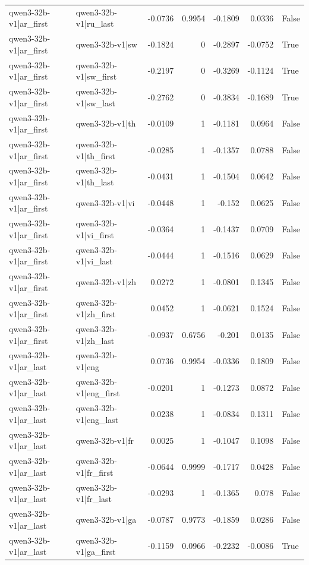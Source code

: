 \begin{table}
\begin{tabular}{l l r r r r l}
qwen3-32b-v1|ar_first & qwen3-32b-v1|ru_last & -0.0736 & 0.9954 & -0.1809 & 0.0336 & False \\
qwen3-32b-v1|ar_first & qwen3-32b-v1|sw & -0.1824 & 0 & -0.2897 & -0.0752 & True \\
qwen3-32b-v1|ar_first & qwen3-32b-v1|sw_first & -0.2197 & 0 & -0.3269 & -0.1124 & True \\
qwen3-32b-v1|ar_first & qwen3-32b-v1|sw_last & -0.2762 & 0 & -0.3834 & -0.1689 & True \\
qwen3-32b-v1|ar_first & qwen3-32b-v1|th & -0.0109 & 1 & -0.1181 & 0.0964 & False \\
qwen3-32b-v1|ar_first & qwen3-32b-v1|th_first & -0.0285 & 1 & -0.1357 & 0.0788 & False \\
qwen3-32b-v1|ar_first & qwen3-32b-v1|th_last & -0.0431 & 1 & -0.1504 & 0.0642 & False \\
qwen3-32b-v1|ar_first & qwen3-32b-v1|vi & -0.0448 & 1 & -0.152 & 0.0625 & False \\
qwen3-32b-v1|ar_first & qwen3-32b-v1|vi_first & -0.0364 & 1 & -0.1437 & 0.0709 & False \\
qwen3-32b-v1|ar_first & qwen3-32b-v1|vi_last & -0.0444 & 1 & -0.1516 & 0.0629 & False \\
qwen3-32b-v1|ar_first & qwen3-32b-v1|zh & 0.0272 & 1 & -0.0801 & 0.1345 & False \\
qwen3-32b-v1|ar_first & qwen3-32b-v1|zh_first & 0.0452 & 1 & -0.0621 & 0.1524 & False \\
qwen3-32b-v1|ar_first & qwen3-32b-v1|zh_last & -0.0937 & 0.6756 & -0.201 & 0.0135 & False \\
qwen3-32b-v1|ar_last & qwen3-32b-v1|eng & 0.0736 & 0.9954 & -0.0336 & 0.1809 & False \\
qwen3-32b-v1|ar_last & qwen3-32b-v1|eng_first & -0.0201 & 1 & -0.1273 & 0.0872 & False \\
qwen3-32b-v1|ar_last & qwen3-32b-v1|eng_last & 0.0238 & 1 & -0.0834 & 0.1311 & False \\
qwen3-32b-v1|ar_last & qwen3-32b-v1|fr & 0.0025 & 1 & -0.1047 & 0.1098 & False \\
qwen3-32b-v1|ar_last & qwen3-32b-v1|fr_first & -0.0644 & 0.9999 & -0.1717 & 0.0428 & False \\
qwen3-32b-v1|ar_last & qwen3-32b-v1|fr_last & -0.0293 & 1 & -0.1365 & 0.078 & False \\
qwen3-32b-v1|ar_last & qwen3-32b-v1|ga & -0.0787 & 0.9773 & -0.1859 & 0.0286 & False \\
qwen3-32b-v1|ar_last & qwen3-32b-v1|ga_first & -0.1159 & 0.0966 & -0.2232 & -0.0086 & True \\

\end{tabular}
\end{table}
